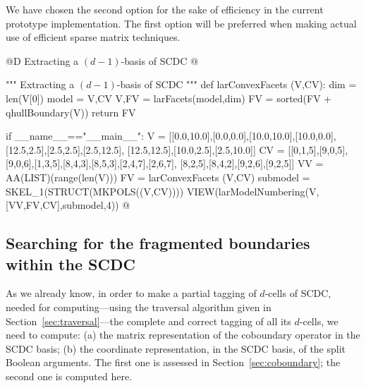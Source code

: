 \documentclass[11pt,oneside]{article}	%
\begin{document}
We have chosen the second option  for the sake of efficiency in the current prototype implementation. The first option will be preferred when making actual use of efficient sparse matrix techniques.

@D Extracting a $(d-1)$-basis of SCDC
@{""" Extracting a $(d-1)$-basis of SCDC """
def larConvexFacets (V,CV):
	dim = len(V[0])
	model = V,CV
	V,FV = larFacets(model,dim)
	FV = sorted(FV + qhullBoundary(V))
	return FV
	
if __name__=="__main__":
	V = [[0.0,10.0],[0.0,0.0],[10.0,10.0],[10.0,0.0],[12.5,2.5],[2.5,2.5],[2.5,12.5],
		 [12.5,12.5],[10.0,2.5],[2.5,10.0]]
	CV = [[0,1,5],[9,0,5],[9,0,6],[1,3,5],[8,4,3],[8,5,3],[2,4,7],[2,6,7],
		  [8,2,5],[8,4,2],[9,2,6],[9,2,5]]
	VV = AA(LIST)(range(len(V)))
	FV = larConvexFacets (V,CV)
	submodel = SKEL_1(STRUCT(MKPOLS((V,CV))))
	VIEW(larModelNumbering(V,[VV,FV,CV],submodel,4))
@}


\subsection{Searching for the fragmented boundaries within the SCDC}

As we already know, in order to make a partial tagging of $d$-cells of SCDC, needed for computing---using the traversal algorithm given in Section~\ref{sec:traversal}---the complete and correct tagging of all its  $d$-cells, we need to compute: (a) the matrix representation of the coboundary operator in the SCDC basis; (b) the coordinate representation, in the SCDC basis, of the split Boolean arguments. The first one is assessed in Section~\ref{sec:coboundary}; the second one is computed here.
\end{document}
